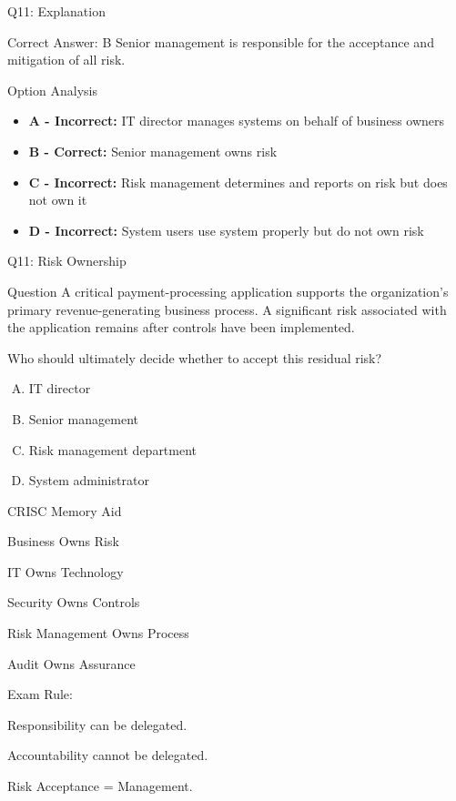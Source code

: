 \documentclass{beamer}
\begin{document}
	\begin{frame}{Q11: Explanation}
		\begin{block}{Correct Answer: B}
			Senior management is responsible for the acceptance and mitigation of all risk.
		\end{block}
		\begin{block}{Option Analysis}
			\begin{itemize}
				\item \textbf{A - Incorrect:} IT director manages systems on behalf of business owners
				\item \textbf{B - Correct:} Senior management owns risk
				\item \textbf{C - Incorrect:} Risk management determines and reports on risk but does not own it
				\item \textbf{D - Incorrect:} System users use system properly but do not own risk
			\end{itemize}
		\end{block}
	\end{frame}
	
	
	
	
	\begin{frame}[shrink=10]{Q11: Risk Ownership}
		\begin{block}{Question}
			A critical payment-processing application supports the
			organization's primary revenue-generating business process.
			A significant risk associated with the application remains
			after controls have been implemented.
			
			Who should ultimately decide whether to accept this residual risk?
		\end{block}
		
		\begin{enumerate}[(A)]
			\item IT director
			\item Senior management
			\item Risk management department
			\item System administrator
		\end{enumerate}
		
				\begin{block}{CRISC Memory Aid}
			
			Business Owns Risk
			
			IT Owns Technology
			
			Security Owns Controls
			
			Risk Management Owns Process
			
			Audit Owns Assurance
			
			\vspace{0.15cm}
			
			Exam Rule:
			
			Responsibility can be delegated.
			
			Accountability cannot be delegated.
			
			Risk Acceptance = Management.
			
		\end{block}
	\end{frame}
	
\end{document}
